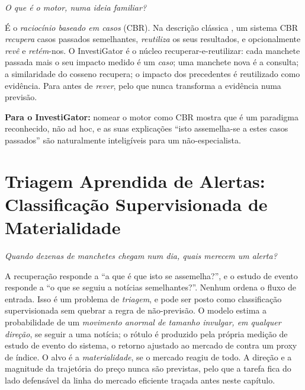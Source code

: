 \emph{O que é o motor, numa ideia familiar?}

É o \emph{raciocínio baseado em casos} (CBR). Na descrição clássica \autocite{aamodt1994cbr}, um sistema
CBR \emph{recupera} casos passados semelhantes, \emph{reutiliza} os seus resultados, e opcionalmente
\emph{revê} e \emph{retém}-nos. O InvestiGator é o núcleo recuperar-e-reutilizar: cada manchete passada mais
o seu impacto medido é um \emph{caso}; uma manchete nova é a consulta; a similaridade do cosseno recupera;
o impacto dos precedentes é reutilizado como evidência. Para antes de \emph{rever}, pelo que nunca
transforma a evidência numa previsão.

\textbf{Para o InvestiGator:} nomear o motor como CBR mostra que é um paradigma reconhecido, não ad hoc, e
as suas explicações ``isto assemelha-se a estes casos passados'' são naturalmente inteligíveis para um
não-especialista.

\section{Triagem Aprendida de Alertas: Classificação Supervisionada de Materialidade}
\label{sec:sota_triage}

\emph{Quando dezenas de manchetes chegam num dia, quais merecem um alerta?}

A recuperação responde a ``a que é que isto se assemelha?'', e o estudo de evento responde a ``o que se
seguiu a notícias semelhantes?''. Nenhum ordena o fluxo de entrada. Isso é um problema de \emph{triagem}, e
pode ser posto como classificação supervisionada sem quebrar a regra de não-previsão. O modelo estima a
probabilidade de um \emph{movimento anormal de tamanho invulgar, em qualquer direção}, se seguir a uma
notícia; o rótulo é produzido pela própria medição de estudo de evento do sistema, o retorno ajustado ao
mercado de \textcite{brown1985daily} contra um proxy de índice. O alvo é a \emph{materialidade}, se o
mercado reagiu de todo. A direção e a magnitude da trajetória do preço nunca são previstas, pelo que a
tarefa fica do lado defensável da linha do mercado eficiente traçada antes neste capítulo.

